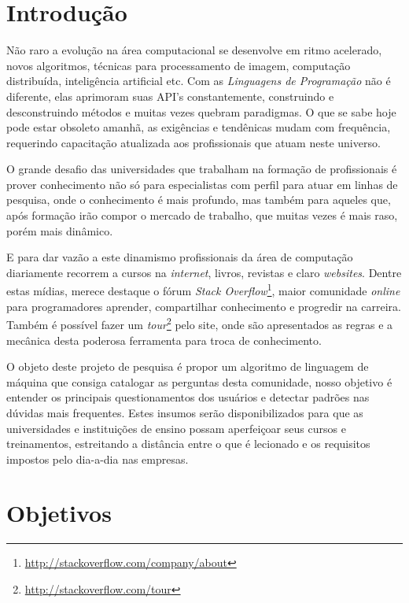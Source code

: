 \documentclass[
	12pt,				%
	openright,		%
	twoside,			%
	a4paper,			%
	english,				%
	french,				%
	spanish,			%
	brazil,				%
	]{abntex2}
\begin{document}
\chapter*[Introdução]{Introdução}

Não raro a evolução na área computacional se desenvolve em ritmo acelerado, novos algoritmos, técnicas para processamento de imagem, computação distribuída, inteligência artificial etc. Com as \emph{Linguagens de Programação} não é diferente, elas aprimoram suas API's constantemente, construindo e desconstruindo métodos e muitas vezes quebram paradigmas. O que se sabe hoje pode estar obsoleto amanhã, as exigências e tendênicas mudam com frequência, requerindo capacitação atualizada aos profissionais que atuam neste universo.  

O grande desafio das universidades que trabalham na formação de profissionais é prover conhecimento não só para especialistas com perfil para atuar em linhas de pesquisa, onde o conhecimento é mais profundo, mas também para aqueles que, após formação irão compor o mercado de trabalho, que muitas vezes é mais raso, porém mais dinâmico.

E para dar vazão a este dinamismo profissionais da área de computação diariamente recorrem a cursos na \textit{internet}, livros, revistas e claro \textit{websites}. Dentre estas mídias, merece destaque o fórum \textit{Stack Overflow}\footnote{\url{http://stackoverflow.com/company/about}}, maior comunidade \textit{online} para programadores aprender, compartilhar conhecimento e progredir na carreira. Também é possível fazer um \textit{tour}\footnote{\url{http://stackoverflow.com/tour}} pelo site, onde são apresentados as regras e a mecânica desta poderosa ferramenta para troca de conhecimento.

O objeto deste projeto de pesquisa é propor um algoritmo de linguagem de máquina que consiga catalogar as perguntas desta comunidade, nosso objetivo é entender os principais questionamentos dos usuários e detectar padrões nas dúvidas mais frequentes. Estes insumos serão disponibilizados para que as universidades e instituições de ensino possam aperfeiçoar seus cursos e treinamentos, estreitando a distância entre o que é lecionado e os requisitos impostos pelo dia-a-dia nas empresas.

\chapter{Objetivos}
\end{document}
